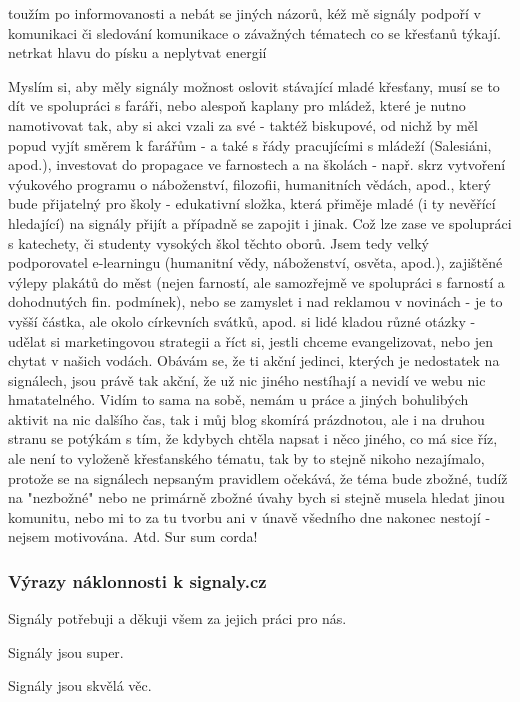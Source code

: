 toužím po informovanosti a nebát se jiných názorů, kéž mě signály podpoří v komunikaci či sledování komunikace o závažných tématech co se křesťanů týkají. netrkat hlavu do písku a neplytvat energií

Myslím si, aby měly signály možnost oslovit stávající mladé křesťany, musí se to dít ve spolupráci s faráři, nebo alespoň kaplany pro mládež, které je nutno namotivovat tak, aby si akci vzali za své - taktéž biskupové, od nichž by měl popud vyjít směrem k farářům - a také s řády pracujícími s mládeží (Salesiáni, apod.), investovat do propagace ve farnostech a na školách - např. skrz vytvoření výukového programu o náboženství, filozofii, humanitních vědách, apod., který bude přijatelný pro školy - edukativní složka, která přiměje mladé (i ty nevěřící hledající) na signály přijít a případně se zapojit i jinak. Což lze zase ve spolupráci s katechety, či studenty vysokých škol těchto oborů. Jsem tedy velký podporovatel e-learningu (humanitní vědy, náboženství, osvěta, apod.), zajištěné výlepy plakátů do měst (nejen farností, ale samozřejmě ve spolupráci s farností a dohodnutých fin. podmínek), nebo se zamyslet i nad reklamou v novinách - je to vyšší částka, ale okolo církevních svátků, apod. si lidé kladou různé otázky - udělat si marketingovou strategii a říct si, jestli chceme evangelizovat, nebo jen chytat v našich vodách. Obávám se, že ti akční jedinci, kterých je nedostatek na signálech, jsou právě tak akční, že už nic jiného nestíhají a nevidí ve webu nic hmatatelného. Vidím to sama na sobě, nemám u práce a jiných bohulibých aktivit na nic dalšího čas, tak i můj blog skomírá prázdnotou, ale i na druhou stranu se potýkám s tím, že kdybych chtěla napsat i něco jiného, co má sice říz, ale není to vyloženě křesťanského tématu, tak by to stejně nikoho nezajímalo, protože se na signálech nepsaným pravidlem očekává, že téma bude zbožné, tudíž na "nezbožné" nebo ne primárně zbožné úvahy bych si stejně musela hledat jinou komunitu, nebo mi to za tu tvorbu ani v únavě všedního dne nakonec nestojí - nejsem motivována. Atd. Sur sum corda!

\subsubsection{Výrazy náklonnosti k signaly.cz}

Signály potřebuji a děkuji všem za jejich práci pro nás.

Signály jsou super.

Signály jsou skvělá věc.

